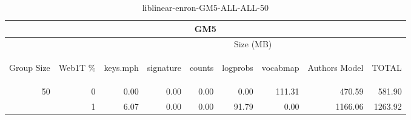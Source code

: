 \begin{center}
\begin{table}[htbp] 
 \begin{center}
\begin{tabular}{ | r | r | r | r | r | r | r | r | r |}
\hline
\multicolumn{9}{|c|}{GM5}\\
\hline
 & & \multicolumn{7}{|c|}{Size (MB)}\\ \cline{3-9}
\begin{sideways}Group Size\end{sideways} & \begin{sideways}Web1T \% \end{sideways} & \begin{sideways}keys.mph\end{sideways} & \begin{sideways}signature\end{sideways} & \begin{sideways}counts\end{sideways} & \begin{sideways}logprobs\end{sideways} & \begin{sideways}vocabmap\end{sideways} & \begin{sideways}Authors Model \end{sideways} & \begin{sideways}TOTAL\end{sideways}\\
\hline
\multirow{1}{*}{50}
 & 0 & 0.00 & 0.00 & 0.00 & 0.00 & 111.31 & 470.59 & 581.90\\ \cline{2-9}
 & 1 & 6.07 & 0.00 & 0.00 & 91.79 & 0.00 & 1166.06 & 1263.92\\ \cline{2-9}
\hline
\end{tabular}
\caption{liblinear-enron-GM5-ALL-ALL-50}
\label{table:liblinear-enron-GM5-ALL-ALL-50}
\end{center}
 \end{table}
\end{center}

